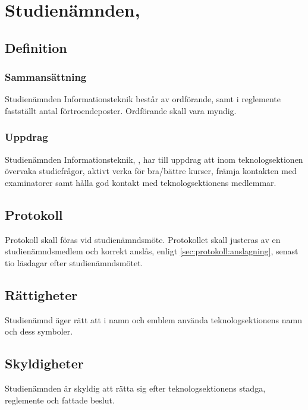\section{Studienämnden, \SNIT}

\subsection{Definition}

\subsubsection{Sammansättning}
Studienämnden Informationsteknik består av ordförande, samt i reglemente fastställt antal förtroendeposter. Ordförande skall vara myndig.

\subsubsection{Uppdrag}
Studienämnden Informationsteknik, \SNIT{}, har till uppdrag att inom teknologsektionen övervaka studiefrågor, aktivt verka för bra/bättre kurser, främja kontakten med examinatorer samt hålla god kontakt med teknologsektionens medlemmar.

\subsection{Protokoll}
Protokoll skall föras vid studienämndsmöte. Protokollet skall justeras av en studienämndsmedlem och korrekt anslås, enligt \ref{sec:protokoll:anslagning}, senast tio läsdagar efter studienämndsmötet.

\subsection{Rättigheter}
Studienämnd äger rätt att i namn och emblem använda teknologsektionens namn och dess symboler.

\subsection{Skyldigheter}
Studienämnden är skyldig att rätta sig efter teknologsektionens stadga, reglemente och fattade beslut.